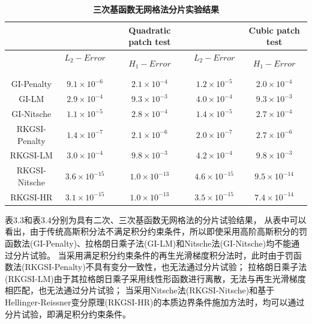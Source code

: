    \begin{table}[h]
    \caption{\textbf{三次基函数无网格法分片实验结果}}
    \centering
   \begin{tabular}{ccccc}
   \toprule
   &$\quad$ &Quadratic patch test &$\quad$ &Cubic patch test\\
   \midrule
   &$L_2-Error$$\quad$&$H_1-Error$&$L_2-Error$$\quad$&$H_1-Error$\\
   \midrule
   GI-Penalty&$9.1\times10^{-6}$&$2.1\times10^{-4}$&$1.2\times10^{-5}$&$2.0\times10^{-4}$\\
   GI-LM&$2.9\times10^{-4}$&$9.3\times10^{-3}$&$4.0\times10^{-4}$&$9.3\times10^{-3}$\\
   GI-Nitsche&$1.1\times10^{-5}$&$2.8\times10^{-4}$&$1.4\times10^{-5}$&$2.7\times10^{-4}$\\
  RKGSI-Penalty&$1.4\times10^{-7}$&$2.1\times10^{-6}$&$2.0\times10^{-7}$&$2.7\times10^{-6}$\\
  RKGSI-LM&$3.0\times10^{-4}$&$9.8\times10^{-3}$&$4.2\times10^{-4}$&$9.8\times10^{-3}$\\
  RKGSI-Nitsche&$3.6\times10^{-15}$&$1.0\times10^{-13}$&$4.6\times10^{-15}$&$9.5\times10^{-14}$\\
  RKGSI-HR&$3.1\times10^{-15}$&$1.0\times10^{-13}$&$3.5\times10^{-15}$&$7.4\times10^{-14}$\\
   \bottomrule
   \end{tabular}
   \end{table}  
表3.3和表3.4分别为具有二次、三次基函数无网格法的分片试验结果，
从表中可以看出，由于传统高斯积分法不满足积分约束条件，所以即使采用高阶高斯积分的罚函数法(GI-Penalty)、拉格朗日乘子法(GI-LM)和Nitsche法(GI-Nitsche)均不能通过分片试验。
当采用满足积分约束条件的再生光滑梯度积分法时，此时由于罚函数法(RKGSI-Penalty)不具有变分一致性，也无法通过分片试验；
拉格朗日乘子法(RKGSI-LM)由于其拉格朗日乘子采用线性形函数进行离散，无法与再生光滑梯度相匹配，也无法通过分片试验；
当采用Nitsche法(RKGSI-Nitsche)和基于Hellinger-Reissner变分原理(RKGSI-HR)的本质边界条件施加方法时，均可以通过分片试验，即满足积分约束条件。
